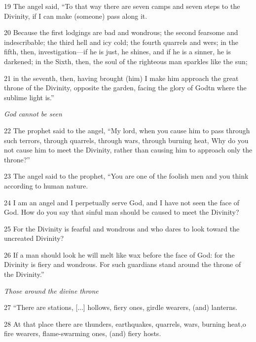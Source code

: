 \par 19 The angel said, “To that way there are seven camps and seven steps to the Divinity, if I can make (someone) pass along it.

\par 20 Because the first lodgings are bad and wondrous; the second fearsome and indescribable; the third hell and icy cold; the fourth quarrels and wers; in the fifth, then, investigation—if he is just, he shines, and if he is a sinner, he is darkened; in the Sixth, then, the soul of the righteous man sparkles like the sun;

\par 21 in the seventh, then, having brought (him) I make him approach the great throne of the Divinity, opposite the garden, facing the glory of Godtn where the sublime light is.”

\par \textit{God cannot be seen}

\par 22 The prophet said to the angel, “My lord, when you cause him to pass through such terrors, through quarrels, through wars, through burning heat, Why do you not cause him to meet the Divinity, rather than causing him to approach only the throne?”

\par 23 The angel said to the prophet, “You are one of the foolish men and you think according to human nature.

\par 24 I am an angel and I perpetually serve God, and I have not seen the face of God. How do you say that sinful man should be caused to meet the Divinity?

\par 25 For the Divinity is fearful and wondrous and who dares to look toward the uncreated Divinity?

\par 26 If a man should look he will melt like wax before the face of God: for the Divinity is fiery and wondrous. For such guardians stand around the throne of the Divinity.”

\par \textit{Those around the divine throne}

\par 27 “There are stations, [...] hollows, fiery ones, girdle wearers, (and) lanterns.

\par 28 At that place there are thunders, earthquakes, quarrels, wars, burning heat,o fire wearers, flame-swarming ones, (and) fiery hosts.

